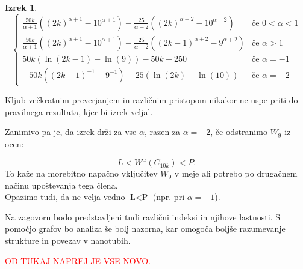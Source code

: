 \documentclass[a4paper, 12pt]{article}
\newtheorem{izrek}{Izrek}[section]
\begin{document}
\begin{izrek}
\begin{equation*}
\begin{cases}
            \frac{50k}{\alpha + 1} \left( (2k)^{\alpha + 1} - 10^{\alpha + 1} \right) - 
            \frac{25}{\alpha + 2} \left( (2k)^{\alpha + 2} - 10^{\alpha + 2} \right) & \text{če } 0 < \alpha < 1 \\
    
            \frac{50k}{\alpha + 1} \left( (2k)^{\alpha + 1} - 10^{\alpha + 1} \right) - 
            \frac{25}{\alpha + 2} \left( (2k-1)^{\alpha + 2} - 9^{\alpha + 2} \right) & \text{če } \alpha > 1 \\
    
            50k \left( \ln(2k-1) - \ln(9) \right) - 50k + 250 & \text{če } \alpha = -1 \\
    
            -50k \left( (2k-1)^{-1} - 9^{-1} \right) - 25 \left( \ln(2k) - \ln(10) \right) & \text{če } \alpha = -2
        \end{cases}
    \end{equation*}
    


    
\end{izrek}


{\color{red} 
   Kljub večkratnim preverjanjem in različnim pristopom nikakor ne uspe priti do pravilnega rezultata, 
   kjer bi izrek veljal. 
   
   Zanimivo pa je, da izrek drži za vse $\alpha$, razen za $\alpha = -2$, če odstranimo $W_9$ iz ocen:
}
\[
L < W^\alpha(C_{10k}) < P.
\]
{\color{red}
   To kaže na morebitno napačno vključitev $W_9$ v meje ali potrebo po drugačnem načinu upoštevanja tega člena. \\  
   Opazimo tudi, da ne velja vedno $ \text{L} < \text{P} $ (npr. pri $\alpha = -1$).
}


Na zagovoru bodo predstavljeni tudi različni indeksi in njihove lastnosti.
S pomočjo grafov bo analiza še bolj nazorna, kar omogoča boljše razumevanje strukture in povezav v nanotubih.

\textcolor{red}{OD TUKAJ NAPREJ JE VSE NOVO.}
\end{document}
